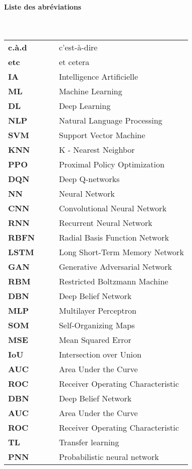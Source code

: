 \thispagestyle{plain}
\textbf{\Large{Liste des abréviations}}\\\\\\
\begin{tabular}{llll}


\textbf{c.à.d} & & & c'est-à-dire\\
\textbf{etc} & & & et cetera\\
\textbf{IA} & & & Intelligence Artificielle\\
\textbf{ML} & & & Machine Learning\\
\textbf{DL} & & & Deep Learning\\
\textbf{NLP} & & & Natural Language Processing\\
\textbf{SVM} & & & Support Vector Machine\\
\textbf{KNN} & & & K - Nearest Neighbor\\
\textbf{PPO} & & & Proximal Policy Optimization \\
\textbf{DQN} & & & Deep Q-networks\\
\textbf{NN} & & & Neural Network\\
\textbf{CNN} & & & Convolutional Neural Network\\
\textbf{RNN} & & & Recurrent Neural Network\\
\textbf{RBFN} & & & Radial Basis Function Network\\
\textbf{LSTM} & & & Long Short-Term Memory Network\\
\textbf{GAN} & & & Generative Adversarial Network\\
\textbf{RBM} & & & Restricted Boltzmann Machine\\
\textbf{DBN} & & & Deep Belief Network\\
\textbf{MLP} & & & Multilayer Perceptron\\
\textbf{SOM} & & & Self-Organizing Maps\\
\textbf{MSE} & & & Mean Squared Error\\
\textbf{IoU} & & & Intersection over Union\\
\textbf{AUC} & & & Area Under the Curve\\
\textbf{ROC} & & & Receiver Operating Characteristic\\
\textbf{DBN} & & & Deep Belief Network\\
\textbf{AUC} & & & Area Under the Curve\\
\textbf{ROC} & & & Receiver Operating Characteristic\\
\textbf{TL} & & & Transfer learning \\
\textbf{PNN} & & & Probabilistic neural network \\



\end{tabular}
